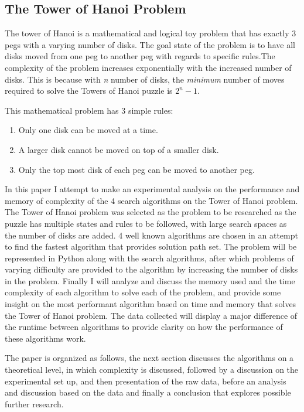 \documentclass[conference]{IEEEtran}
\begin{document}
\subsection{The Tower of Hanoi Problem}

The tower of Hanoi is a mathematical and logical toy problem that has exactly 3 pegs with a varying number of disks. The goal state of the problem is to have all disks moved from one peg to another peg with regards to specific rules.The complexity of the problem increases exponentially with the increased number of disks. This is because with \textit {n} number of disks, the \textit{minimum} number of moves required to solve the Towers of Hanoi puzzle is $2^{n} - 1$. \cite{FamousPuzzles}

This mathematical problem has 3 simple rules:

\begin{enumerate}
\item Only one disk can be moved at a time.
\item A larger disk cannot be moved on top of a smaller disk.
\item Only the top most disk of each peg can be moved to another peg. 
\end{enumerate}

In this paper I attempt to make an experimental analysis on the performance and memory of complexity of the 4 search algorithms on the Tower of Hanoi problem. The Tower of Hanoi problem was selected as the problem to be researched as the puzzle has multiple states and rules to be followed, with large search spaces as the number of disks are added. 4 well known algorithms are chosen in an attempt to find the fastest algorithm that provides solution path set. The problem will be represented in Python along with the search algorithms, after which problems of varying difficulty are provided to the algorithm by increasing the number of disks in the problem. Finally I will analyze and discuss the memory used and the time complexity of each algorithm to solve each of the problem, and provide some insight on the most performant algorithm based on time and memory that solves the Tower of Hanoi problem. The data collected will display a major difference of the runtime between algorithms to provide clarity on how the performance of these algorithms work. 

The paper is organized as follows, the next section discusses the algorithms on a theoretical level, in which complexity is discussed, followed by a discussion on the experimental set up, and then presentation of the raw data, before an analysis and discussion based on the data and finally a conclusion that explores possible further research.
\end{document}
